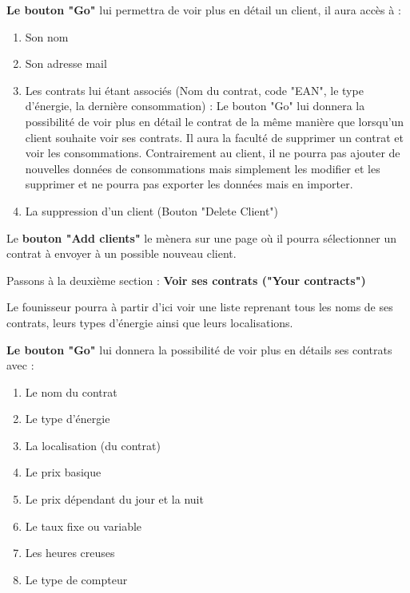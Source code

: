 \begin{flushleft}
\textbf{Le bouton "Go"} lui permettra de voir plus en détail un client, il aura accès à :
\end{flushleft}
\begin{enumerate}
\item Son nom
\item Son adresse mail
\item Les contrats lui étant associés (Nom du contrat, code "EAN", le type d'énergie, la dernière consommation) : \newline
Le bouton "Go" lui donnera la possibilité de voir plus en détail le contrat de la même manière que lorsqu'un client souhaite voir ses contrats.\newline
Il aura la faculté de supprimer un contrat et voir les consommations.\newline
Contrairement au client, il ne pourra pas ajouter de nouvelles données de consommations mais simplement les modifier et les supprimer et ne pourra pas exporter les données mais en importer.
\item La suppression d'un client (Bouton "Delete Client")
\end{enumerate}

\begin{flushleft}
Le \textbf{bouton "Add clients"} le mènera sur une page où il pourra sélectionner un contrat à envoyer à un possible nouveau client.
\end{flushleft}

\newpage

\begin{flushleft}
Passons à la deuxième section : \textbf{Voir ses contrats ("Your contracts")}
\end{flushleft}

\begin{flushleft}
Le founisseur pourra à partir d'ici voir une liste reprenant tous les noms de ses contrats, leurs types d'énergie ainsi que leurs localisations. 
\end{flushleft}

\begin{flushleft}
\textbf{Le bouton "Go"} lui donnera la possibilité de voir plus en détails ses contrats avec :
\end{flushleft}
\begin{enumerate}
\item Le nom du contrat
\item Le type d'énergie
\item La localisation (du contrat)
\item Le prix basique
\item Le prix dépendant du jour et la nuit
\item Le taux fixe ou variable
\item Les heures creuses
\item Le type de compteur
\end{enumerate}

